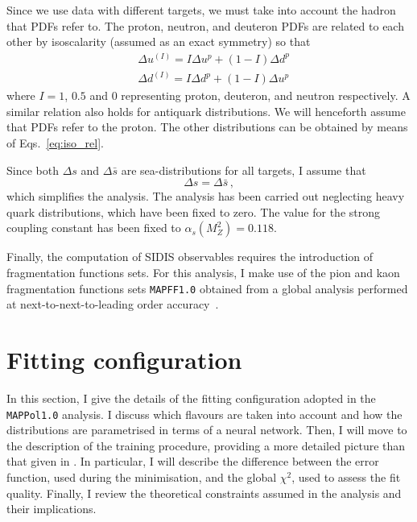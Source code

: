 Since we use data with different targets, we must take into account the hadron that PDFs refer to. The proton, neutron, and deuteron PDFs are related to each other by isoscalarity (assumed as an exact symmetry) so that
\begin{equation}
  \begin{split}
    &\Delta u^{(I)} = I \Delta u^p + ( 1 - I ) \Delta d^p \\
    &\Delta d^{(I)} = I \Delta d^p + ( 1 - I ) \Delta u^p
  \end{split}
  \label{eq:iso_rel}
\end{equation}
where $I=1$, $0.5$ and $0$ representing proton, deuteron, and neutron respectively. A similar relation also holds for antiquark distributions. We will henceforth assume that PDFs refer to the proton. The other distributions can be obtained by means of Eqs.~\eqref{eq:iso_rel}.%

Since both $\Delta s$ and $\Delta \bar{s}$ are sea-distributions for all targets, I assume that
\begin{equation}
  \Delta s = \Delta \bar{s} \,,
\end{equation}
which simplifies the analysis. The analysis has been carried out neglecting heavy quark distributions, which have been fixed to zero. The value for the strong coupling constant has been fixed to $\alpha_s(M_Z^2) = 0.118$.%

Finally, the computation of SIDIS observables requires the introduction of fragmentation functions sets. For this analysis, I make use of the pion and kaon fragmentation functions sets \texttt{MAPFF1.0} obtained from a global analysis performed at next-to-next-to-leading order accuracy~\cite{Khalek:2021gxf, AbdulKhalek:2022laj}.

\section{Fitting configuration}
\label{sec:4.3}
In this section, I give the details of the fitting configuration adopted in the \texttt{MAPPol1.0} analysis. I discuss which flavours are taken into account and how the distributions are parametrised in terms of a neural network. Then, I will move to the description of the training procedure, providing a more detailed picture than that given in . In particular, I will describe the difference between the error function, used during the minimisation, and the global $\chi^2$, used to assess the fit quality. Finally, I review the theoretical constraints assumed in the analysis and their implications.

